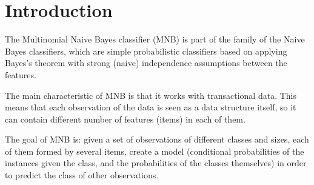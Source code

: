 \section{Introduction}
The Multinomial Naive Bayes classifier (MNB) is part of the family of the Naive Bayes classifiers, which are simple probabilistic classifiers based on applying Bayes's theorem with strong (naive) independence assumptions between the features.

The main characteristic of MNB is that it works with transactional data. This means that each observation of the data is seen as a data structure itself, so it can contain different number of features (items) in each of them.

The goal of MNB is: given a set of observations of different classes and sizes, each of them formed by several items, create a model (conditional probabilities of the instances given the class, and the probabilities of the classes themselves) in order to predict the class of other observations.